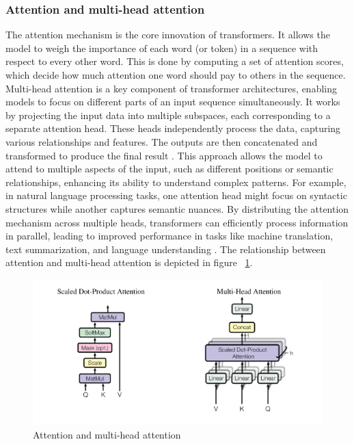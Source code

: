 \documentclass[licencjacka,en]{pracamgr}
\begin{document}
\subsubsection{Attention and multi-head attention}
The attention mechanism is the core innovation of transformers. It allows the model to weigh the importance of each word (or token) in a sequence with respect to every other word. This is done by computing a set of attention scores, which decide how much attention one word should pay to others in the sequence.
Multi-head attention is a key component of transformer architectures, enabling models to focus on different parts of an input sequence simultaneously. It works by projecting the input data into multiple subspaces, each corresponding to a separate attention head. These heads independently process the data, capturing various relationships and features. The outputs are then concatenated and transformed to produce the final result \cite{attention}.
This approach allows the model to attend to multiple aspects of the input, such as different positions or semantic relationships, enhancing its ability to understand complex patterns. For example, in natural language processing tasks, one attention head might focus on syntactic structures while another captures semantic nuances.
By distributing the attention mechanism across multiple heads, transformers can efficiently process information in parallel, leading to improved performance in tasks like machine translation, text summarization, and language understanding \cite{medium_medium_t}.
The relationship between attention and multi-head attention is depicted in figure ~\ref{fig:attention_fig}.

\begin{figure}
    \centering
    \includegraphics[width=0.7\linewidth]{bachelor_images/attention_fig.png}
    \caption{Attention and multi-head attention \cite{attention}}
    \label{fig:attention_fig}
\end{figure}
\end{document}
